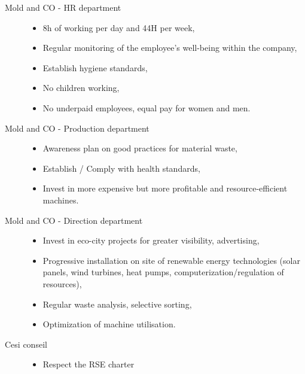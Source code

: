 \begin{description}
    \item[Mold and CO - HR department]
    \begin{itemize}
        \item 8h of working per day and 44H per week,
        \item Regular monitoring of the employee's well-being within the company,
        \item Establish hygiene standards,
        \item No children working,
        \item No underpaid employees, equal pay for women and men.
    \end{itemize} 
\end{description}  

\begin{description}
    \item[Mold and CO - Production department]
    \begin{itemize}
        \item Awareness plan on good practices for material waste,
        \item Establish / Comply with health standards,
        \item Invest in more expensive but more profitable and resource-efficient machines.
    \end{itemize} 
\end{description}  

\begin{description}
    \item[Mold and CO - Direction department]
    \begin{itemize}
        \item Invest in eco-city projects for greater visibility, advertising,
        \item Progressive installation on site of renewable energy technologies (solar panels, wind turbines, heat pumps, computerization/regulation of resources),
        \item Regular waste analysis, selective sorting,
        \item Optimization of machine utilisation.
    \end{itemize} 
\end{description}  

\begin{description}
    \item[Cesi conseil]
    \begin{itemize}
        \item Respect the RSE charter
    \end{itemize} 
\end{description}  

